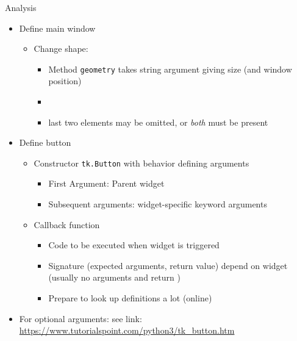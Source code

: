 \begin{frame}[fragile]{Analysis}
%
\begin{itemize}
\item Define main window
	\begin{itemize}
	\item Change shape: 
		\begin{itemize}
		\item Method \texttt{geometry} takes string argument giving size (and window position)
		\item {}
		\item last two elements may be omitted, or \emph{both} must be present
		\end{itemize}
	\end{itemize}
\item Define button
	\begin{itemize}
	\item Constructor \texttt{tk.Button} with behavior defining arguments
		\begin{itemize}
		\item First Argument: Parent widget
		\item Subsequent arguments: widget-specific keyword arguments
		\end{itemize}
	\item Callback function
		\begin{itemize}
		\item Code to be executed when widget is triggered
		\item Signature (expected arguments, return value) depend on widget \\
			(usually no arguments and return )
		\item Prepare to look up definitions a lot (\zB online)
		\end{itemize}
	\end{itemize}
\item For optional arguments: see link: {\scriptsize \url{https://www.tutorialspoint.com/python3/tk_button.htm}}
\end{itemize}
%
\end{frame}


